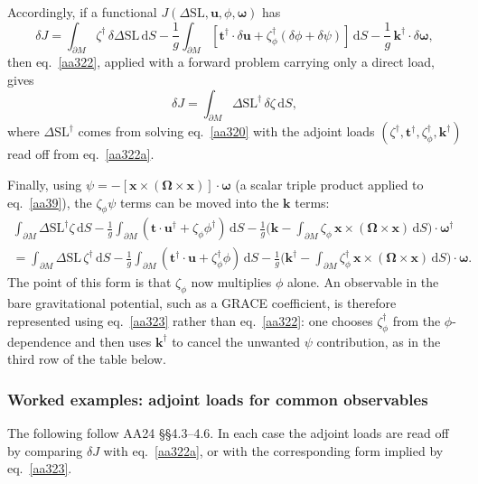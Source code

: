 \documentclass[11pt,a4paper]{article}
\newcommand{\bO}{\bm{\Omega}}
\newcommand{\bw}{\bm{\omega}}
\newcommand{\bx}{\mathbf{x}}
\newcommand{\bu}{\mathbf{u}}
\newcommand{\bt}{\mathbf{t}}
\newcommand{\bk}{\mathbf{k}}
\newcommand{\dSL}{\Delta\mathrm{SL}}
\newcommand{\dd}{\,\mathrm{d}}
\newcommand{\pM}{\partial M}
\begin{document}
Accordingly, if a functional $J(\dSL,\bu,\phi,\bw)$ has
\begin{equation}
  \delta J=\int_{\pM}\zeta^\dagger\,\delta\dSL\dd S-\frac1g\int_{\pM}[\bt^\dagger\cdot\delta\bu+\zeta^\dagger_\phi(\delta\phi+\delta\psi)]\dd S-\frac1g\,\bk^\dagger\cdot\delta\bw ,
  \tag{3.22a}\label{aa322a}
\end{equation}
then eq.~\eqref{aa322}, applied with a forward problem carrying only a direct load, gives
\begin{equation}
  \delta J=\int_{\pM}\dSL^\dagger\,\delta\zeta\dd S ,
  \tag{3.22b}\label{aa322b}
\end{equation}
where $\dSL^\dagger$ comes from solving eq.~\eqref{aa320} with the adjoint loads
$(\zeta^\dagger,\bt^\dagger,\zeta^\dagger_\phi,\bk^\dagger)$ read off from eq.~\eqref{aa322a}.

Finally, using $\psi=-[\bx\times(\bO\times\bx)]\cdot\bw$ (a scalar triple product applied to
eq.~\ref{aa39}), the $\zeta_\phi\psi$ terms can be moved into the $\bk$ terms:
\begin{multline}
  \int_{\pM}\dSL^\dagger\zeta\dd S-\frac1g\int_{\pM}(\bt\cdot\bu^\dagger+\zeta_\phi\phi^\dagger)\dd S-\frac1g\Big(\bk-\int_{\pM}\zeta_\phi\,\bx\times(\bO\times\bx)\dd S\Big)\cdot\bw^\dagger\\
  =\int_{\pM}\dSL\,\zeta^\dagger\dd S-\frac1g\int_{\pM}(\bt^\dagger\cdot\bu+\zeta^\dagger_\phi\phi)\dd S-\frac1g\Big(\bk^\dagger-\int_{\pM}\zeta^\dagger_\phi\,\bx\times(\bO\times\bx)\dd S\Big)\cdot\bw .
  \tag{3.23}\label{aa323}
\end{multline}
The point of this form is that $\zeta_\phi$ now multiplies $\phi$ alone. An observable in the bare
gravitational potential, such as a GRACE coefficient, is therefore represented using
eq.~\eqref{aa323} rather than eq.~\eqref{aa322}: one chooses $\zeta_\phi^\dagger$ from the
$\phi$-dependence and then uses $\bk^\dagger$ to cancel the unwanted $\psi$ contribution, as in the
third row of the table below.

\subsubsection{Worked examples: adjoint loads for common observables}

The following follow AA24 \S\S4.3--4.6. In each case the adjoint loads are read off by comparing
$\delta J$ with eq.~\eqref{aa322a}, or with the corresponding form implied by eq.~\eqref{aa323}.
\end{document}
